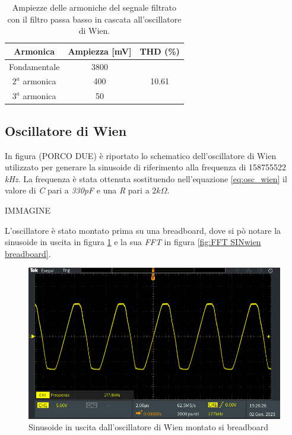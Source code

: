 \documentclass[titlepage]{report}
\begin{document}
	\begin{table}[h!]
		\centering
		\begin{tabular}{||c|c|c||}
			\hline
			\cellcolor{gray!10}Armonica & \cellcolor{gray!10}Ampiezza [mV] & \cellcolor{gray!10}THD (\%) \\
			\hline
			Fondamentale & 3800 &\\
			\cline{1-2}
			$2^a$ armonica & 400 & 10.61 \\
			\cline{1-2} 
			$3^a$ armonica & 50 & \\
			\hline	
		\end{tabular}
		\caption{Ampiezze delle armoniche del segnale filtrato con il filtro passa basso in cascata all'oscillatore di Wien.}
		\label{tab:THD_WIEN+LP}
	\end{table}

	\subsection{Oscillatore di Wien}
	\label{subsc: wien giusto}

	In figura (PORCO DUE) è riportato lo schematico dell'oscillatore di Wien utilizzato per generare la sinusoide di riferimento alla frequenza di 158755522 \textit{kHz}. La frequenza è stata ottenuta sostituendo nell'equazione \ref{eq:osc_wien} il valore di \textit{C} pari a \textit{330pF} e una \textit{R} pari a \textit{$2 k\Omega$}.

	IMMAGINE

	L'oscillatore è stato montato prima su una breadboard, dove si pò notare la sinusoide in uscita in figura \ref{fig:SINwien breadboard} e la sua \textit{FFT} in figura \ref{fig:FFT SINwien breadboard}.


	\begin{figure}[H]
		\centering
		\includegraphics[scale=0.5]{Immagini/Wien sin giusto bread.PNG}
		\caption{Sinusoide in uscita dall'oscillatore di Wien montato si breadboard}
		\label{fig:SINwien breadboard}
	\end{figure} 
\end{document}

